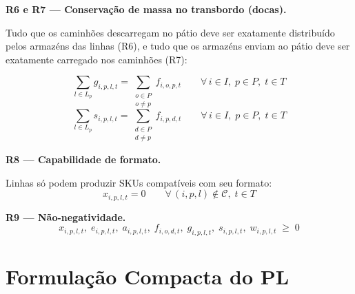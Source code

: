 \documentclass[12pt, a4paper]{article}
\begin{document}
\vspace{8pt}

\begin{mdframed}[style=destaque]
\textbf{\color{ballblue}R6 e R7 --- Conserva\c{c}\~{a}o de massa no transbordo (docas).}
\medskip

Tudo que os caminh\~{o}es descarregam no p\'{a}tio deve ser exatamente distribu\'{i}do
pelos armazéns das linhas (R6), e tudo que os armazéns enviam ao p\'{a}tio deve
ser exatamente carregado nos caminh\~{o}es (R7):

\[
  \sum_{l \in L_p} g_{i,p,l,t} = \sum_{\substack{o \in P \\ o \neq p}} f_{i,o,p,t}
  \qquad \forall\, i \in I,\; p \in P,\; t \in T \tag{R6}
\]
\[
  \sum_{l \in L_p} s_{i,p,l,t} = \sum_{\substack{d \in P \\ d \neq p}} f_{i,p,d,t}
  \qquad \forall\, i \in I,\; p \in P,\; t \in T \tag{R7}
\]
\end{mdframed}

\vspace{8pt}

\begin{mdframed}[style=destaque]
\textbf{\color{ballblue}R8 --- Capabilidade de formato.}
\medskip

Linhas s\'{o} podem produzir SKUs compat\'{i}veis com seu formato:
\[
  x_{i,p,l,t} = 0 \qquad \forall\, (i,p,l) \notin \mathcal{C},\; t \in T
\]
\end{mdframed}

\vspace{8pt}

\begin{mdframed}[style=destaque]
\textbf{\color{ballblue}R9 --- N\~{a}o-negatividade.}
\[
  x_{i,p,l,t},\; e_{i,p,l,t},\; a_{i,p,l,t},\; f_{i,o,d,t},\;
  g_{i,p,l,t},\; s_{i,p,l,t},\; w_{i,p,l,t} \;\geq\; 0
\]
\end{mdframed}

\newpage
\section{Formula\c{c}\~{a}o Compacta do PL}
\end{document}
